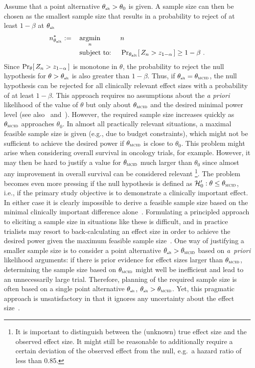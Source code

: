 \documentclass{article}
\renewcommand{\Pr}{\operatorname{Pr}}
\newcommand{\st}{\operatorname{subject\ to:\ }}
\newcommand{\argmin}[1]{\operatornamewithlimits{argmin}_{#1}}
\begin{document}
\newcommand{\altv}{\theta_{\scaleto{\operatorname{alt}}{3.5pt}}}
Assume that a point alternative $\altv>\theta_0$ is given.
A sample size can then be chosen as the smallest sample size that results in a probability to reject of at least $1-\beta$ at $\altv$
\begin{align}
    n^*_{\altv} :=\quad &\argmin{n}\ &&n \nonumber\\
          &\st         &&\Pr_{\altv}[\,Z_n > \criticalvalue\,] \geq 1 - \beta \ .
          \label{eq:simle-pwr-cnstr}
\end{align}
Since $\Pr_{\theta}[\,Z_n > \criticalvalue\,]$ is monotone in $\theta$, the probability to reject the null hypothesis for $\theta>\altv$ is also greater than $1-\beta$.
Thus, if $\altv=\mcid$, the null hypothesis can be rejected for all clinically relevant effect sizes with a probability of at least $1-\beta$.
This approach requires no assumptions about the \textit{a priori} likelihood of the value of $\theta$ but only
about $\mcid$ and the desired minimal power level
(see also~\cite[Section 3]{chuang2011} and~\citealp{chuang-2006}).
However, the required sample size increases quickly as $\mcid$ approaches $\theta_0$.
In almost all practically relevant situations, a maximal feasible sample size is given (e.g., due to budget constraints), which might not be sufficient to achieve the desired power if $\mcid$ is close to $\theta_0$.
This problem might arise when considering overall survival in oncology trials, for example.
However, it may then be hard to justify a value for $\mcid$ much larger than $\theta_0$ since almost any improvement in overall survival can be considered relevant
\footnote{It is important to distinguish between the (unknown) true effect size and the observed effect size.
It might still be reasonable to additionally require a certain deviation of the observed effect from the null, e.g.~a hazard ratio of less than 0.85.}.
The problem becomes even more pressing if the null hypothesis is defined as $\mathcal{H}_0':\theta \leq \mcid$, i.e.,
if the primary study objective is to demonstrate a clinically important effect.
In either case it is clearly impossible to derive a feasible sample size based on the minimal clinically important difference alone~\citep{chuang2011}.
Formulating a principled approach to eliciting a sample size in situations like these is difficult, and in practice trialists may resort to back-calculating an effect size in order to achieve the desired power given the maximum feasible sample size~\citep{lenth2001,lan-2012,grouin-2007}.
One way of justifying a smaller sample size is to consider a point alternative $\altv>\mcid$ based on \textit{a~priori} likelihood arguments: if there is prior evidence for effect sizes larger than $\mcid$, determining the sample size based on $\mcid$ might well be inefficient and lead to an unnecessarily large trial.
Therefore, planning of the required sample size is often based on a single point alternative $\altv$, $\altv > \mcid$.
Yet, this pragmatic approach is unsatisfactory in that it ignores any uncertainty about the effect
size~\citep{lenth2001}.
\end{document}
